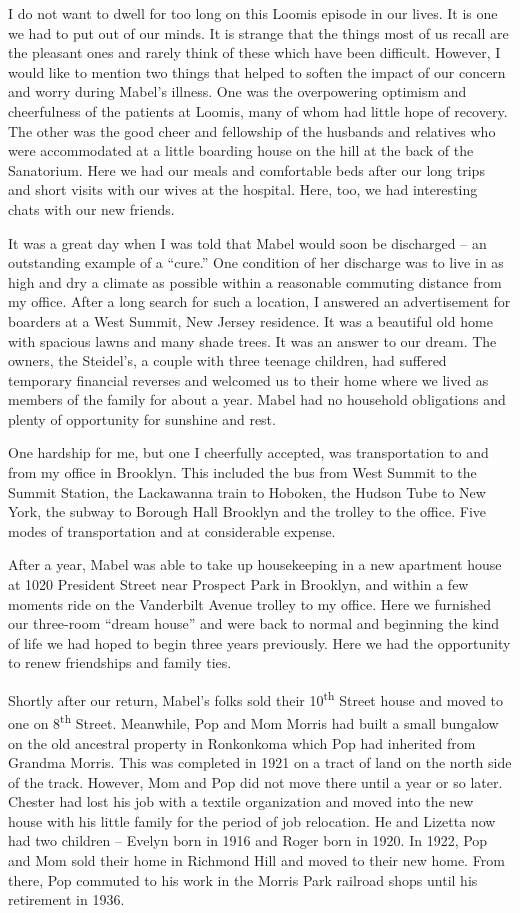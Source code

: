 \documentclass[12pt]{book}              %
\begin{document}
I do not want to dwell for too long on this Loomis episode in our lives. It is one we had to put out of our minds. It is strange that the things most of us recall are the pleasant ones and rarely think of these which have been difficult. However, I would like to mention two things that helped to soften the impact of our concern and worry during Mabel's illness. One was the overpowering optimism and cheerfulness of the patients at Loomis, many of whom had little hope of recovery. The other was the good cheer and fellowship of the husbands and relatives who were accommodated at a little boarding house on the hill at the back of the Sanatorium. Here we had our meals and comfortable beds after our long trips and short visits with our wives at the hospital. Here, too, we had interesting chats with our new friends.

It was a great day when I was told that Mabel would soon be discharged -- an outstanding example of a ``cure.'' One condition of her discharge was to live in as high and dry a climate as possible within a reasonable commuting distance from my office. After a long search for such a location, I answered an advertisement for boarders at a West Summit, New Jersey residence. It was a beautiful old home with spacious lawns and many shade trees. It was an answer to our dream. The owners, the Steidel's, a couple with three teenage children, had suffered temporary financial reverses and welcomed us to their home where we lived as members of the family for about a year. Mabel had no household obligations and plenty of opportunity for sunshine and rest. 

One hardship for me, but one I cheerfully accepted, was transportation to and from my office in Brooklyn. This included the bus from West Summit to the Summit Station, the Lackawanna train to Hoboken, the Hudson Tube to New York, the subway to Borough Hall Brooklyn and the trolley to the office. Five modes of transportation and at considerable expense. 

After a year, Mabel was able to take up housekeeping in a new apartment house at 1020 President Street near Prospect Park in Brooklyn, and within a few moments ride on the Vanderbilt Avenue trolley to my office. Here we furnished our three-room ``dream house'' and were back to normal and beginning the kind of life we had hoped to begin three years previously. Here we had the opportunity to renew friendships and family ties. 

Shortly after our return, Mabel's folks sold their 10\textsuperscript{th} Street house and moved to one on 8\textsuperscript{th} Street. Meanwhile, Pop and Mom Morris had built a small bungalow on the old ancestral property in Ronkonkoma which Pop had inherited from Grandma Morris. This was completed in 1921 on a tract of land on the north side of the track. However, Mom and Pop did not move there until a year or so later. Chester had lost his job with a textile organization and moved into the new house with his little family for the period of job relocation. He and Lizetta now had two children -- Evelyn born in 1916 and Roger born in 1920. In 1922, Pop and Mom sold their home in Richmond Hill and moved to their new home. From there, Pop commuted to his work in the Morris Park railroad shops until his retirement in 1936.
\end{document}
